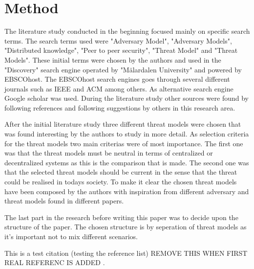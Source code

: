 \section{Method}
The literature study conducted in the beginning focused mainly on specific search terms. The search terms used were "Adversary Model", "Adversary Models", "Distributed knowledge", "Peer to peer security", "Threat Model" and "Threat Models".
These initial terms were chosen by the authors and used in the "Discovery" search engine operated by "Mälardalen University" and powered by EBSCOhost.
The EBSCOhost search engines goes through several different journals such as IEEE and ACM among others.
As alternative search engine Google scholar was used.
During the literature study other sources were found by following references and following suggestions by others in this research area.

After the initial literature study three different threat models were chosen that was found interesting by the authors to study in more detail.
As selection criteria for the threat models two main criterias were of most importance. 
The first one was that the threat models must be neutral in terms of centralized or decentralized systems as this is the comparison that is made.
The second one was that the selected threat models should be current in the sense that the threat could be realised in todays society.
To make it clear the chosen threat models have been composed by the authors with inspiration from different adversary and threat models found in different papers.

The last part in the research before writing this paper was to decide upon the structure of the paper. The chosen structure is by seperation of threat models as it's important not to mix different scenarios.

This is a test citation (testing the reference list) REMOVE THIS WHEN FIRST REAL REFERENC IS ADDED \cite{Lamport:LaTeX}.
